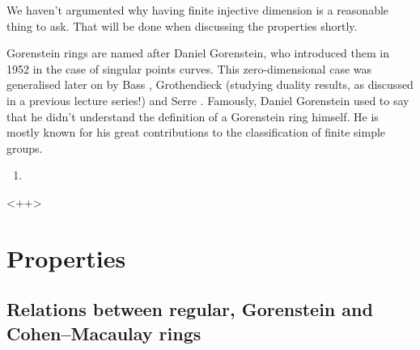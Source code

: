 \documentclass[10pt,a4paper]{article}
\begin{document}
We haven't argumented why having finite injective dimension is a reasonable thing to ask. That will be done when discussing the properties shortly.

\begin{remark}
  Gorenstein rings are named after Daniel Gorenstein, who introduced them in 1952 \cite{gorenstein-arithmetic-theory-adjoint-plane-curves} in the case of singular points curves. This zero-dimensional case was generalised later on by Bass \cite{bass-ubiquity-gorenstein-rings}, Grothendieck \cite{grothendieck-theoremes-de-dualite} (studying duality results, as discussed in a previous lecture series!) and Serre \cite{serre-sur-les-modules-projectifs}. Famously, Daniel Gorenstein used to say that he didn't understand the definition of a Gorenstein ring himself. He is mostly known for his great contributions to the classification of finite simple groups.
\end{remark}

\begin{enumerate}
  \item 
\end{enumerate}<++>


\section{Properties}
\subsection{Relations between regular, Gorenstein and Cohen--Macaulay rings}
\end{document}
